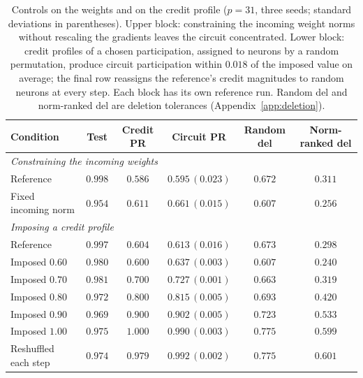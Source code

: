 \documentclass{article} %
\begin{document}
\begin{table}[!ht]
\caption{Controls on the weights and on the credit profile ($p=31$, three seeds; standard deviations in parentheses). Upper block: constraining the incoming weight norms without rescaling the gradients leaves the circuit concentrated. Lower block: credit profiles of a chosen participation, assigned to neurons by a random permutation, produce circuit participation within $0.018$ of the imposed value on average; the final row reassigns the reference's credit magnitudes to random neurons at every step. Each block has its own reference run. Random del and norm-ranked del are deletion tolerances (Appendix~\ref{app:deletion}).}
\label{tab:named}
\begin{center}
\small
\setlength{\tabcolsep}{4pt}
\begin{tabular}{lccccc}
\toprule
Condition & Test & Credit PR & Circuit PR & Random del & Norm-ranked del \\
\midrule
\multicolumn{6}{l}{\emph{Constraining the incoming weights}} \\
Reference & $0.998$ & $0.586$ & $0.595\,(0.023)$ & $0.672$ & $0.311$ \\
Fixed incoming norm & $0.954$ & $0.611$ & $0.661\,(0.015)$ & $0.607$ & $0.256$ \\
\midrule
\multicolumn{6}{l}{\emph{Imposing a credit profile}} \\
Reference & $0.997$ & $0.604$ & $0.613\,(0.016)$ & $0.673$ & $0.298$ \\
Imposed $0.60$ & $0.980$ & $0.600$ & $0.637\,(0.003)$ & $0.607$ & $0.240$ \\
Imposed $0.70$ & $0.981$ & $0.700$ & $0.727\,(0.001)$ & $0.663$ & $0.319$ \\
Imposed $0.80$ & $0.972$ & $0.800$ & $0.815\,(0.005)$ & $0.693$ & $0.420$ \\
Imposed $0.90$ & $0.969$ & $0.900$ & $0.902\,(0.005)$ & $0.723$ & $0.533$ \\
Imposed $1.00$ & $0.975$ & $1.000$ & $0.990\,(0.003)$ & $0.775$ & $0.599$ \\
Reshuffled each step & $0.974$ & $0.979$ & $0.992\,(0.002)$ & $0.775$ & $0.601$ \\
\bottomrule
\end{tabular}
\end{center}
\end{table}
\end{document}
